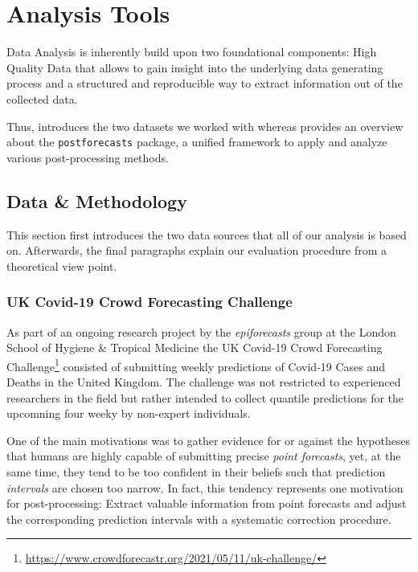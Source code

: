 \documentclass[
]{article}
\author{}
\date{\vspace{-2.5em}}
\DeclareRobustCommand{\href}[2]{#2\footnote{\url{#1}}}
\begin{document}
\hypertarget{analysis-tools}{%
\section{Analysis Tools}\label{analysis-tools}}

Data Analysis is inherently build upon two foundational components: High Quality Data that allows to gain insight into the underlying data generating process and a structured and reproducible way to extract information out of the collected data.

Thus,  introduces the two datasets we worked with whereas  provides an overview about the \texttt{postforecasts} package, a unified framework to apply and analyze various post-processing methods.

\hypertarget{data}{%
\subsection{Data \& Methodology}\label{data}}

This section first introduces the two data sources that all of our analysis is based on.
Afterwards, the final paragraphs explain our evaluation procedure from a theoretical view point.

\hypertarget{uk-covid-19-crowd-forecasting-challenge}{%
\subsubsection{UK Covid-19 Crowd Forecasting Challenge}\label{uk-covid-19-crowd-forecasting-challenge}}

As part of an ongoing research project by the \emph{epiforecasts} group at the London School of Hygiene \& Tropical Medicine the \href{https://www.crowdforecastr.org/2021/05/11/uk-challenge/}{UK Covid-19 Crowd Forecasting Challenge} consisted of submitting weekly predictions of Covid-19 Cases and Deaths in the United Kingdom.
The challenge was not restricted to experienced researchers in the field but rather intended to collect quantile predictions for the upcomning four weeky by non-expert individuals.

One of the main motivations was to gather evidence for or against the hypotheses that humans are highly capable of submitting precise \emph{point forecasts}, yet, at the same time, they tend to be too confident in their beliefs such that prediction \emph{intervals} are chosen too narrow.
In fact, this tendency represents one motivation for post-processing: Extract valuable information from point forecasts and adjust the corresponding prediction intervals with a systematic correction procedure.
\end{document}
